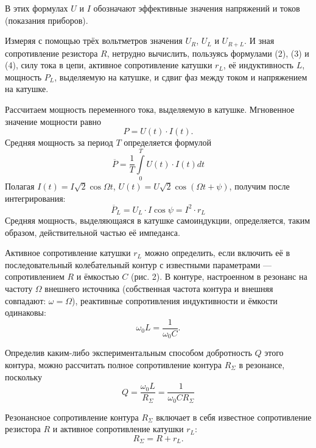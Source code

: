 В этих формулах $U$ и $I$ обозначают
эффективные значения напряжений и токов
(показания приборов).

Измеряя с помощью трёх вольтметров
значения $U_R$, $U_L$ и $U_{R+L}$. И зная
сопротивление резистора $R$, нетрудно
вычислить, пользуясь формулами (2), (3)
и (4), силу тока в цепи, активное
сопротивление катушки $r_L$, её
индуктивность $L$, мощность $P_L$, выделяемую
на катушке, и сдвиг фаз между током и
напряжением на катушке. 

Рассчитаем мощность переменного тока,
выделяемую в катушке. Мгновенное
значение мощности равно 
\begin{equation*}
    P = U(t)\cdot I(t).
\end{equation*}
Средняя мощность за период $T$
определяется формулой
\[
    \overline{P} = \frac{1}{T}
    \int\limits_0^T U(t) \cdot I(t) dt
\]
Полагая $I(t) = I\sqrt{2}\cos\Omega t$,
$U(t) = U\sqrt{2} \cos (\Omega t +
\psi)$, получим после интегрирования:
\begin{equation}
    \overline P_L = U_L \cdot I \cos
    \psi = I^2 \cdot r_L
\end{equation}
Средняя мощность, выделяющаяся в катушке
самоиндукции, определяется, таким
образом, действительной частью её
импеданса.

Активное сопротивление катушки $r_L$ можно
определить, если включить её в
последовательный колебательный контур с
известными параметрами — сопротивлением
$R$ и ёмкостью $C$ (рис. 2). В контуре,
настроенном в резонанс на частоту
$\Omega$ 
внешнего источника (собственная частота
контура и внешняя совпадают: $\omega =
\Omega$),
реактивные сопротивления индуктивности и
ёмкости одинаковы:
\begin{equation}
    \omega_0 L = \frac{1}{\omega_0 C}.
\end{equation}

Определив каким-либо экспериментальным
способом добротность $Q$ этого контура,
можно рассчитать полное сопротивление
контура $R_\Sigma$ в резонансе, поскольку
\begin{equation}
    Q = \frac{\omega_0 L}{R_\Sigma} =
    \frac{1}{\omega_0 C R_\Sigma}
\end{equation}

Резонансное сопротивление контура
$R_\Sigma$
включает в себя известное сопротивление
резистора $R$ и активное сопротивление
катушки $r_L$:
\begin{equation}
    R_\Sigma = R + r_L .
\end{equation}

